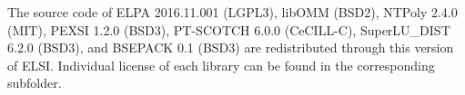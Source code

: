 \documentclass{report}
\begin{document}
The source code of ELPA 2016.11.001 (LGPL3), libOMM (BSD2), NTPoly 2.4.0 (MIT), PEXSI 1.2.0 (BSD3), PT-SCOTCH 6.0.0 (CeCILL-C), SuperLU\_DIST 6.2.0 (BSD3), and BSEPACK 0.1 (BSD3) are redistributed through this version of ELSI. Individual license of each library can be found in the corresponding subfolder.
\end{document}
